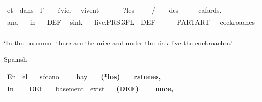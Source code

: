 \begin{tabular}{llllllllllllllllll}
\lsptoprule
et & \multicolumn{2}{l}{dans

} & \multicolumn{2}{l}{l’

} & \multicolumn{2}{l}{évier

} & \multicolumn{2}{l}{vivent

} & \multicolumn{2}{l}{?les

} & \multicolumn{2}{l}{/

} & \multicolumn{2}{l}{des

} & \multicolumn{2}{l}{cafards.

} & \\
\multicolumn{2}{l}{and

} & \multicolumn{2}{l}{in

} & \multicolumn{2}{l}{DEF

} & \multicolumn{2}{l}{sink

} & \multicolumn{2}{l}{live.PRS.3PL

} & \multicolumn{2}{l}{DEF

} & \multicolumn{2}{l}{} & \multicolumn{2}{l}{PARTART

} & \multicolumn{2}{l}{cockroaches

}\\
\lspbottomrule
\end{tabular}

\begin{styleTranslation}
‘In the basement there are the mice and under the sink live the cockroaches.’ 

\end{styleTranslation}

\begin{listWWNumileveli}
\item {}

\begin{styleExample}
Spanish

\end{styleExample}

\end{listWWNumileveli}

\begin{tabular}{llllllllllll}
\lsptoprule
En & \multicolumn{2}{l}{el

} & \multicolumn{2}{l}{sótano

} & \multicolumn{2}{l}{hay

} & \multicolumn{2}{l}{{\bfseries (*los)}

} & \multicolumn{2}{l}{{\bfseries ratones,}

} & \\
\multicolumn{2}{l}{In

} & \multicolumn{2}{l}{DEF

} & \multicolumn{2}{l}{basement

} & \multicolumn{2}{l}{exist

} & \multicolumn{2}{l}{{\bfseries (DEF)}

} & \multicolumn{2}{l}{{\bfseries mice,}

}\\
\lspbottomrule
\end{tabular}

